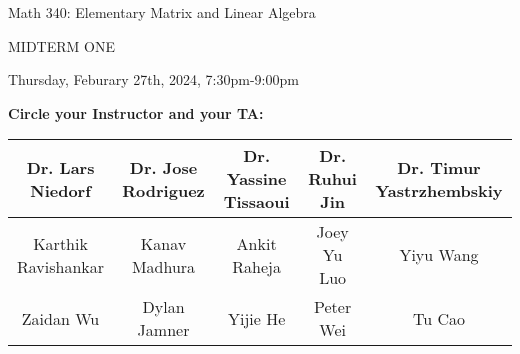 \documentclass[12pt]{extarticle}
\begin{document}
\LARGE{Math 340: Elementary Matrix and Linear Algebra}

\bigskip

\Huge{MIDTERM ONE} \normalsize

\bigskip

Thursday, Feburary 27th, 2024, 7:30pm-9:00pm
\vspace{.12in}

\textbf{Circle your Instructor and your TA:}

\begin{table}[h]\centering \small
\begin{tabular}{|c|c|c|c|c|}
\hline
Dr. Lars Niedorf &  Dr. Jose Rodriguez & Dr. Yassine Tissaoui & Dr. Ruhui Jin & Dr. Timur Yastrzhembskiy \\ \hline
Karthik Ravishankar & Kanav Madhura & Ankit Raheja & Joey Yu Luo & Yiyu Wang\\ \hline
Zaidan Wu & Dylan Jamner & Yijie He & Peter Wei & Tu Cao\\ \hline

\end{tabular}
\end{table}






\vspace{-.2in}
\end{document}
